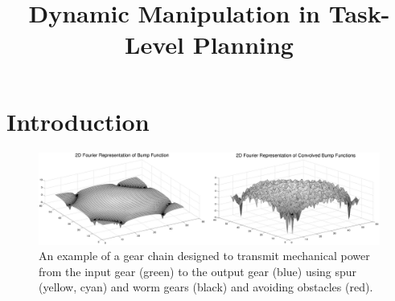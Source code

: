 \documentclass[letterpaper, 10 pt, conference]{ieeeconf}
\title{Dynamic Manipulation in Task-Level Planning}
\author{}
\begin{document}
\maketitle

\section{Introduction}

\begin{figure}[ht!] 
  \centering
  \includegraphics[width=1.0\linewidth]{Figures/bumpFouriers.png}
  \caption{An example of a gear chain designed to transmit mechanical power from the 
  input gear (green) to the output gear (blue) using spur (yellow, cyan) and worm gears (black) and avoiding
  obstacles (red).}
  \label{fig:main}
\end{figure}

% 
% 
\end{document}
